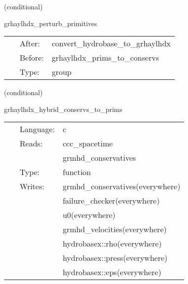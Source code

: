 \vspace{5mm}

   (conditional) 

\hspace{5mm} grhaylhdx\_perturb\_primitives 

\hspace{5mm}{\it perturb initial primitive data } 


\hspace{5mm}

 \begin{tabular*}{160mm}{cll} 
~ & After:  & convert\_hydrobase\_to\_grhaylhdx \\ 
~ & Before:  & grhaylhdx\_prims\_to\_conservs \\ 
~ & Type:  & group \\ 
\end{tabular*} 


\vspace{5mm}

   (conditional) 

\hspace{5mm} grhaylhdx\_hybrid\_conservs\_to\_prims 

\hspace{5mm}{\it hybrid version of grhaylhdx\_conservs\_to\_prims } 


\hspace{5mm}

 \begin{tabular*}{160mm}{cll} 
~ & Language:  & c \\ 
~ & Reads:  & ccc\_spacetime \\ 
~& ~ &grmhd\_conservatives\\ 
~ & Type:  & function \\ 
~ & Writes:  & grmhd\_conservatives(everywhere) \\ 
~& ~ &failure\_checker(everywhere)\\ 
~& ~ &u0(everywhere)\\ 
~& ~ &grmhd\_velocities(everywhere)\\ 
~& ~ &hydrobasex::rho(everywhere)\\ 
~& ~ &hydrobasex::press(everywhere)\\ 
~& ~ &hydrobasex::eps(everywhere)\\ 
\end{tabular*} 


\vspace{5mm}

